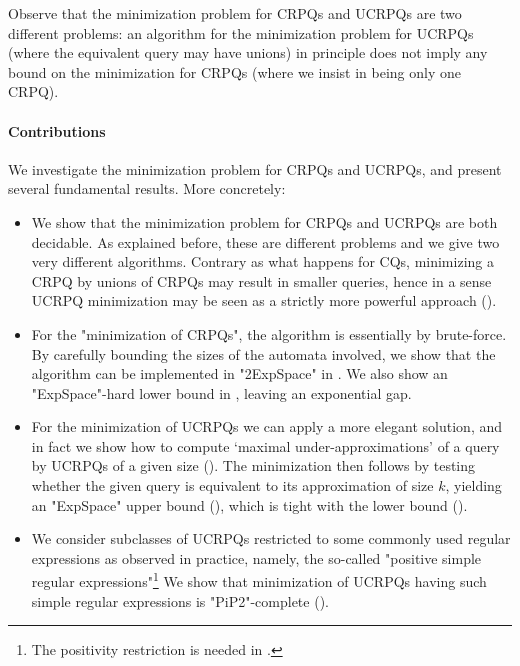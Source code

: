 Observe that the minimization problem for CRPQs and UCRPQs are two different problems: an algorithm for the minimization problem for UCRPQs (where the equivalent query may have unions) in principle does not imply any bound on the minimization for CRPQs (where we insist in being only one CRPQ). 

\paragraph{Contributions}
We investigate the minimization problem for CRPQs and UCRPQs, and present several fundamental results. More concretely:
\begin{itemize}
	\item We show that the minimization problem for CRPQs and UCRPQs are both decidable. As explained before, these are different problems  and we give two very different algorithms. Contrary as what happens for CQs, minimizing a CRPQ by unions of CRPQs may result in smaller queries, hence in a sense UCRPQ minimization may be seen as a strictly more powerful approach ().
	\item For the "minimization of CRPQs", the algorithm is essentially by brute-force. By carefully bounding the sizes of the automata involved, we show that the algorithm can be implemented in "2ExpSpace" in . We also show an "ExpSpace"-hard lower bound in , leaving an exponential gap.
	\item For the minimization of UCRPQs we can apply a more elegant solution, and in fact we show how to compute `maximal under-approximations' of a query by UCRPQs of a given size (). The minimization then follows by testing whether the given query is equivalent to its approximation of size $k$, yielding an "ExpSpace" upper bound (), which is tight with the lower bound ().
	\item We consider subclasses of UCRPQs restricted to some commonly used regular expressions as observed in practice, namely, the so-called "positive simple regular expressions"\footnote{The positivity restriction is needed in .}
		We show that minimization of UCRPQs having such simple regular expressions is
		"PiP2"-complete (). %

\end{itemize}
